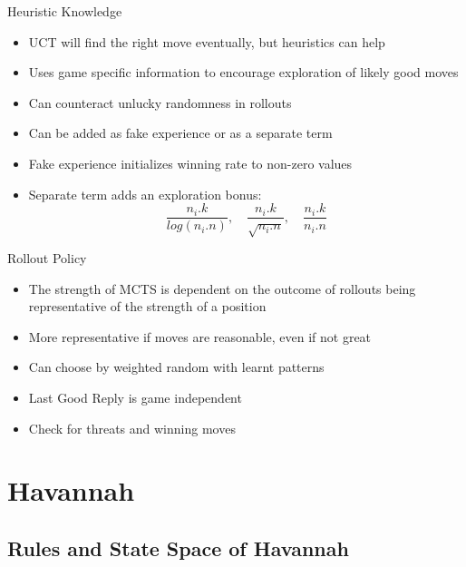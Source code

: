 \documentclass{beamer} %
\begin{document}
\begin{frame}{Heuristic Knowledge}
\begin{itemize}
	\item UCT will find the right move eventually, but heuristics can help
	\item Uses game specific information to encourage exploration of likely good moves
	\item Can counteract unlucky randomness in rollouts
	\item Can be added as fake experience or as a separate term
	\item Fake experience initializes winning rate to non-zero values
	\item Separate term adds an exploration bonus: $$\frac{n_i.k}{log(n_i.n)}, \quad \frac{n_i.k}{\sqrt{n_i.n}}, \quad \frac{n_i.k}{n_i.n}$$
\end{itemize}
\end{frame}


\begin{frame}{Rollout Policy}
\begin{itemize}
	\item The strength of MCTS is dependent on the outcome of rollouts being representative of the strength of a position
	\item More representative if moves are reasonable, even if not great
	\item Can choose by weighted random with learnt patterns
	\item Last Good Reply is game independent
	\item Check for threats and winning moves
\end{itemize}
\end{frame}




\section{Havannah}

\subsection{Rules and State Space of Havannah}
\end{document}
